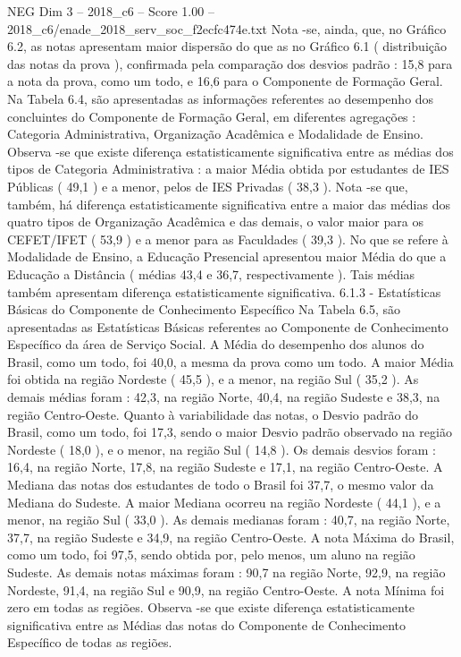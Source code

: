 \begin{textsample}{NEG Dim 3 – 2018\_c6 – Score 1.00 – 2018\_c6/enade\_2018\_serv\_soc\_f2ecfc474e.txt}
Nota -se, ainda, que, no Gráfico 6.2, as notas apresentam maior dispersão do que as no Gráfico 6.1 ( distribuição das notas da prova ), confirmada pela comparação dos desvios padrão : 15,8 para a nota da prova, como um todo, e 16,6 para o Componente de Formação Geral.
Na Tabela 6.4, são apresentadas as informações referentes ao desempenho dos concluintes do Componente de Formação Geral, em diferentes agregações : Categoria Administrativa, Organização Acadêmica e Modalidade de Ensino.
Observa -se que existe diferença estatisticamente significativa entre as médias dos tipos de Categoria Administrativa : a maior Média obtida por estudantes de IES Públicas ( 49,1 ) e a menor, pelos de IES Privadas ( 38,3 ).
Nota -se que, também, há diferença estatisticamente significativa entre a maior das médias dos quatro tipos de Organização Acadêmica e das demais, o valor maior para os CEFET/IFET ( 53,9 ) e a menor para as Faculdades ( 39,3 ).
No que se refere à Modalidade de Ensino, a Educação Presencial apresentou maior Média do que a Educação a Distância ( médias 43,4 e 36,7, respectivamente ).
Tais médias também apresentam diferença estatisticamente significativa. 6.1.3 - Estatísticas Básicas do Componente de Conhecimento Específico Na Tabela 6.5, são apresentadas as Estatísticas Básicas referentes ao Componente de Conhecimento Específico da área de Serviço Social.
A Média do desempenho dos alunos do Brasil, como um todo, foi 40,0, a mesma da prova como um todo.
A maior Média foi obtida na região Nordeste ( 45,5 ), e a menor, na região Sul ( 35,2 ).
As demais médias foram : 42,3, na região Norte, 40,4, na região Sudeste e 38,3, na região Centro-Oeste.
Quanto à variabilidade das notas, o Desvio padrão do Brasil, como um todo, foi 17,3, sendo o maior Desvio padrão observado na região Nordeste ( 18,0 ), e o menor, na região Sul ( 14,8 ).
Os demais desvios foram : 16,4, na região Norte, 17,8, na região Sudeste e 17,1, na região Centro-Oeste.
A Mediana das notas dos estudantes de todo o Brasil foi 37,7, o mesmo valor da Mediana do Sudeste.
A maior Mediana ocorreu na região Nordeste ( 44,1 ), e a menor, na região Sul ( 33,0 ).
As demais medianas foram : 40,7, na região Norte, 37,7, na região Sudeste e 34,9, na região Centro-Oeste.
A nota Máxima do Brasil, como um todo, foi 97,5, sendo obtida por, pelo menos, um aluno na região Sudeste.
As demais notas máximas foram : 90,7 na região Norte, 92,9, na região Nordeste, 91,4, na região Sul e 90,9, na região Centro-Oeste.
A nota Mínima foi zero em todas as regiões.
Observa -se que existe diferença estatisticamente significativa entre as Médias das notas do Componente de Conhecimento Específico de todas as regiões.

\end{textsample}
